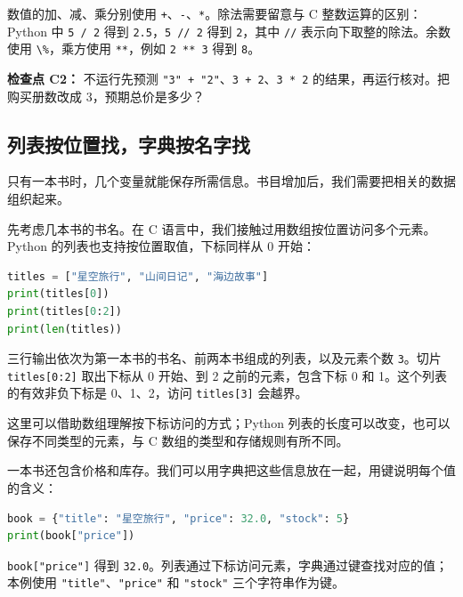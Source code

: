 \documentclass[UTF8,a4paper,11pt,fontset=fandol]{ctexart}
\providecommand{\passthrough}[1]{#1}
\begin{document}
数值的加、减、乘分别使用 \passthrough{\lstinline!+!}、\passthrough{\lstinline!-!}、\passthrough{\lstinline!*!}。除法需要留意与 C 整数运算的区别：Python 中 \passthrough{\lstinline!5 / 2!} 得到 \passthrough{\lstinline!2.5!}，\passthrough{\lstinline!5 // 2!} 得到 \passthrough{\lstinline!2!}，其中 \passthrough{\lstinline!//!} 表示向下取整的除法。余数使用 \passthrough{\lstinline!\%!}，乘方使用 \passthrough{\lstinline!**!}，例如 \passthrough{\lstinline!2 ** 3!} 得到 \passthrough{\lstinline!8!}。

\textbf{检查点 C2：} 不运行先预测 \passthrough{\lstinline!"3" + "2"!}、\passthrough{\lstinline!3 + 2!}、\passthrough{\lstinline!3 * 2!} 的结果，再运行核对。把购买册数改成 3，预期总价是多少？

\clearpage

\subsection{列表按位置找，字典按名字找}\label{ux5217ux8868ux6309ux4f4dux7f6eux627eux5b57ux5178ux6309ux540dux5b57ux627e}

只有一本书时，几个变量就能保存所需信息。书目增加后，我们需要把相关的数据组织起来。

先考虑几本书的书名。在 C 语言中，我们接触过用数组按位置访问多个元素。Python 的列表也支持按位置取值，下标同样从 0 开始：

\begin{lstlisting}[language=Python]
titles = ["星空旅行", "山间日记", "海边故事"]
print(titles[0])
print(titles[0:2])
print(len(titles))
\end{lstlisting}

三行输出依次为第一本书的书名、前两本书组成的列表，以及元素个数 \passthrough{\lstinline!3!}。切片 \passthrough{\lstinline!titles[0:2]!} 取出下标从 0 开始、到 2 之前的元素，包含下标 0 和 1。这个列表的有效非负下标是 0、1、2，访问 \passthrough{\lstinline!titles[3]!} 会越界。

这里可以借助数组理解按下标访问的方式；Python 列表的长度可以改变，也可以保存不同类型的元素，与 C 数组的类型和存储规则有所不同。

一本书还包含价格和库存。我们可以用字典把这些信息放在一起，用键说明每个值的含义：

\begin{lstlisting}[language=Python]
book = {"title": "星空旅行", "price": 32.0, "stock": 5}
print(book["price"])
\end{lstlisting}

\passthrough{\lstinline!book["price"]!} 得到 \passthrough{\lstinline!32.0!}。列表通过下标访问元素，字典通过键查找对应的值；本例使用 \passthrough{\lstinline!"title"!}、\passthrough{\lstinline!"price"!} 和 \passthrough{\lstinline!"stock"!} 三个字符串作为键。
\end{document}

